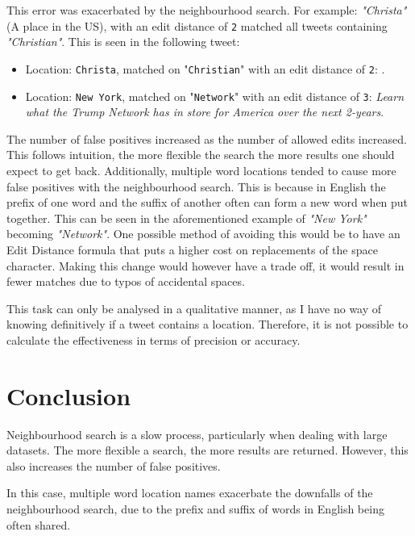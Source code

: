 \documentclass[a4paper]{article}
\begin{document}
This  error was exacerbated by the neighbourhood search. For example: \textit{"Christa"} (A place in the US), with an edit distance of \texttt{2} matched all tweets containing \textit{"Christian"}. This is seen in the following tweet:
\begin{itemize}
 \item Location: \texttt{Christa}, matched on "\texttt{Christian}" with an edit distance of \texttt{2}: \newline {}.
 \item Location: \texttt{New York}, matched on "\texttt{Network}" with an edit distance of \texttt{3}:  \newline \textit{Learn what the Trump Network has in store for America over the next 2-years}.
\end{itemize}
The number of false positives increased as the number of allowed edits increased. This follows intuition, the more flexible the search the more results one should expect to get back.
Additionally, multiple word locations tended to cause more false positives with the neighbourhood search. This is because in English the prefix of one word and the suffix of another often can form a new word when put together. This can be seen in the aforementioned example of \textit{"New York"} becoming \textit{"Network"}.
One possible method of avoiding this would be to have an Edit Distance formula that puts a higher cost on replacements of the space character. Making this change would however have a trade off, it would result in fewer matches due to typos of accidental spaces.

This task can only be analysed in a qualitative manner, as I have no way of knowing definitively if a tweet contains a location. Therefore, it is not possible to calculate the effectiveness in terms of precision or accuracy.

\section{Conclusion}
Neighbourhood search is a slow process, particularly when dealing with large datasets. The more flexible a search, the more results are returned. However, this also increases the number of false positives.

In this case, multiple word location names exacerbate the downfalls of the neighbourhood search, due to the prefix and suffix of words in English being often shared.
\end{document}
